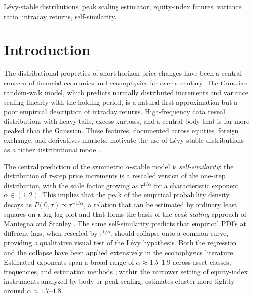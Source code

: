 \documentclass[conference]{IEEEtran}
\begin{document}
\begin{IEEEkeywords}
Lévy-stable distributions, peak scaling estimator, equity-index futures,
variance ratio, intraday returns, self-similarity.
\end{IEEEkeywords}

\section{Introduction}
\label{sec:intro}

The distributional properties of short-horizon price changes have been a
central concern of financial economics and econophysics for over a century.
The Gaussian random-walk model, which predicts
normally distributed increments and variance scaling linearly with the holding
period, is a natural first approximation but a poor empirical description of
intraday returns. High-frequency data reveal distributions with heavy tails,
excess kurtosis, and a central body that is far more peaked than the Gaussian.
These features, documented across equities, foreign exchange, and derivatives
markets, motivate the use of Lévy-stable distributions as a richer
distributional model \cite{Mandelbrot1963,MantegnaStanley1994,Cont2001}.

The central prediction of the symmetric $\alpha$-stable model is
\textit{self-similarity}: the distribution of $\tau$-step price increments is
a rescaled version of the one-step distribution, with the scale factor growing
as $\tau^{1/\alpha}$ for a characteristic exponent $\alpha\in(1,2)$. This
implies that the peak of the empirical probability density
decays as $P(0,\tau)\propto\tau^{-1/\alpha}$, a relation that can be estimated
by ordinary least squares on a log-log plot and that forms the basis of the
\textit{peak scaling} approach of Mantegna and Stanley \cite{MantegnaStanley1994,MantegnaStanley1995}.
The same self-similarity predicts that empirical PDFs at different lags, when
rescaled by $\tau^{1/\alpha}$, should collapse onto a common curve, providing
a qualitative visual test of the Lévy hypothesis. Both the regression and the
collapse have been applied extensively in the econophysics literature.
Estimated exponents span a broad range of $\alpha\approx 1.5$--$1.9$ across
asset classes, frequencies, and estimation methods
\cite{Gopikrishnan1999,Weron2001,BouchaudPotters2003,Chakraborti2011}; within the narrower
setting of equity-index instruments analyzed by body or peak scaling,
estimates cluster more tightly around $\alpha\approx 1.7$--$1.8$.
\end{document}

